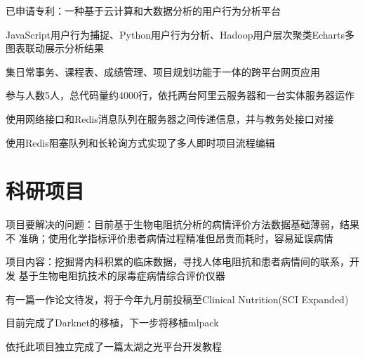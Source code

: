 \documentclass[]{deedy-resume-openfont}
\begin{document}
\begin{minipage}[t]{0.73\textwidth}
	\begin{tightemize}
		\item 已申请专利：一种基于云计算和大数据分析的用户行为分析平台
		\item JavaScript用户行为捕捉、Python用户行为分析、Hadoop用户层次聚类Echarts多 图表联动展示分析结果
	\end{tightemize}
	\sectionsep

	\begin{tightemize}
		\item 集日常事务、课程表、成绩管理、项目规划功能于一体的跨平台网页应用
		\item 参与人数5人，总代码量约4000行，依托两台阿里云服务器和一台实体服务器运作
		\item 使用网络接口和Redis消息队列在服务器之间传递信息，并与教务处接口对接
		\item 使用Redis阻塞队列和长轮询方式实现了多人即时项目流程编辑
	\end{tightemize}
	\sectionsep
	
	\section{科研项目}
	\descript{}
	\begin{tightemize}
		\item 项目要解决的问题：目前基于生物电阻抗分析的病情评价方法数据基础薄弱，结果不 准确；使用化学指标评价患者病情过程精准但昂贵而耗时，容易延误病情
        \item 项目内容：挖掘肾内科积累的临床数据，寻找人体电阻抗和患者病情间的联系，开发 基于生物电阻抗技术的尿毒症病情综合评价仪器
		\item 有一篇一作论文待发，将于今年九月前投稿至Clinical Nutrition(SCI Expanded)
	\end{tightemize}
	\sectionsep

	\descript{}
	\begin{tightemize}
		\item 目前完成了Darknet的移植，下一步将移植mlpack
		\item 依托此项目独立完成了一篇太湖之光平台开发教程
	\end{tightemize}
    \sectionsep
	

\end{minipage}
\end{document}
